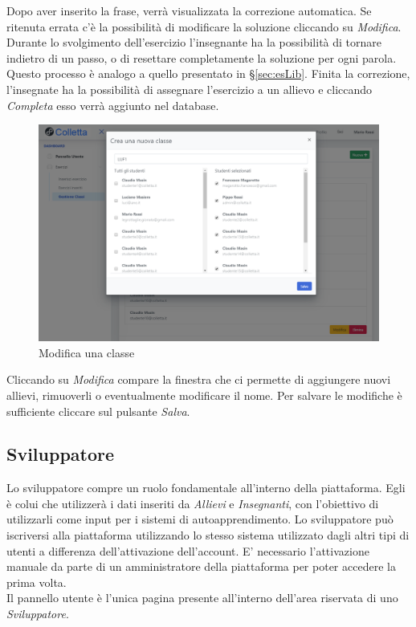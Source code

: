           Dopo aver inserito la frase, verrà visualizzata la correzione automatica. Se ritenuta errata c'è la possibilità di modificare la soluzione cliccando su \textit{Modifica}. Durante lo svolgimento dell'esercizio l'insegnante ha la possibilità di tornare indietro di un passo, o di resettare completamente la soluzione per ogni parola. Questo processo è analogo a quello presentato in \S\ref{sec:esLib}. Finita la correzione, l'insegnate ha la possibilità di assegnare l'esercizio a un allievo e cliccando \textit{Completa} esso verrà aggiunto nel database.
        
         \begin{figure}[H]
            	\centering
        		\includegraphics[width=17cm]{sez/img/insegnante/modificaclasse.PNG} 
            	\caption{Modifica una classe}\label{fig:1}
        	\end{figure}
        	
        	
Cliccando su \textit{Modifica} compare la finestra che ci permette di aggiungere nuovi allievi, rimuoverli o eventualmente modificare il nome. Per salvare le modifiche è sufficiente cliccare sul pulsante \textit{Salva}.
        
	\newpage
    \subsection{Sviluppatore}
    Lo sviluppatore compre un ruolo fondamentale all'interno della piattaforma. Egli è colui che utilizzerà i dati inseriti da \textit{Allievi} e \textit{Insegnanti}, con l'obiettivo di utilizzarli come input per i sistemi di autoapprendimento.
    Lo sviluppatore può iscriversi alla piattaforma utilizzando lo stesso sistema utilizzato dagli altri tipi di utenti a differenza dell'attivazione dell'account. E' necessario l'attivazione manuale da parte di un amministratore della piattaforma per poter accedere la prima volta. 
        	 \\Il pannello utente è l'unica pagina presente all'interno dell'area riservata di uno \textit{Sviluppatore}.
   

